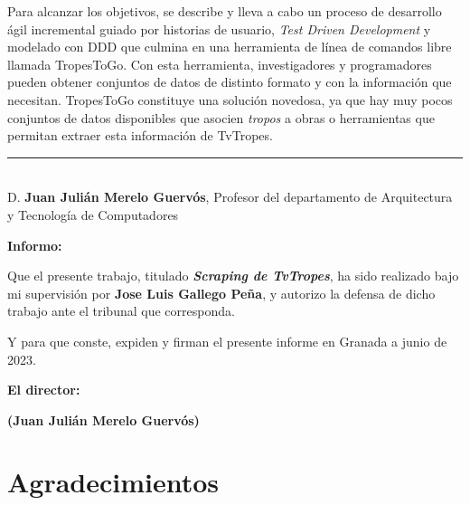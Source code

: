 Para alcanzar los objetivos, se describe y lleva a cabo un proceso de desarrollo
ágil incremental guiado por historias de usuario, \textit{Test Driven
Development} y modelado con DDD que culmina en una herramienta de línea de
comandos libre llamada TropesToGo. Con esta herramienta, investigadores y
programadores pueden obtener conjuntos de datos de distinto formato y con la
información que necesitan. TropesToGo constituye una solución novedosa, ya que
hay muy pocos conjuntos de datos disponibles que asocien \textit{tropos} a obras
o herramientas que permitan extraer esta información de TvTropes.

\cleardoublepage



\cleardoublepage

\thispagestyle{empty}

\noindent\rule[-1ex]{\textwidth}{2pt}\\[4.5ex]

D. \textbf{Juan Julián Merelo Guervós}, Profesor del departamento de Arquitectura y Tecnología de Computadores 

\vspace{0.5cm}

\textbf{Informo:}

\vspace{0.5cm}

Que el presente trabajo, titulado \textit{\textbf{Scraping de TvTropes}}, ha sido realizado bajo mi supervisión por \textbf{Jose Luis Gallego Peña}, y autorizo la defensa de dicho trabajo ante el tribunal que corresponda.

\vspace{0.5cm}

Y para que conste, expiden y firman el presente informe en Granada a junio de 2023.

\vspace{1cm}

\textbf{El director: }

\vspace{5cm}

\noindent \textbf{(Juan Julián Merelo Guervós)}

\chapter*{Agradecimientos}




